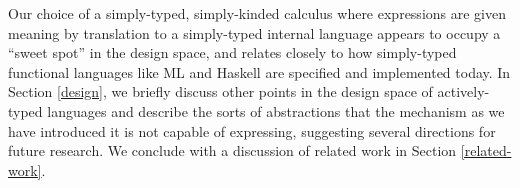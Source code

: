 \documentclass{llncs}
\begin{document}
Our choice of a simply-typed, simply-kinded calculus where expressions are given meaning by translation to a simply-typed internal language appears to occupy a ``sweet spot'' in the design space, and relates closely to how simply-typed functional languages like  ML and Haskell are specified and implemented today. In Section \ref{design}, we briefly discuss other points in the design space of actively-typed languages and describe the sorts of abstractions that the mechanism as we have introduced it is not capable of expressing, suggesting several directions for future research. We conclude with a discussion of related work in Section \ref{related-work}.



\end{document}
